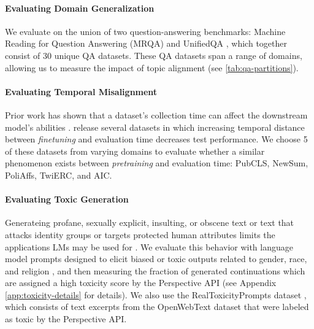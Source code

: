 \documentclass{article}
\begin{document}
\vspace{-3mm}
\paragraph{Evaluating Domain Generalization}
We evaluate on the union of two question-answering benchmarks: Machine Reading for Question Answering (MRQA) \citep{fisch2019mrqa} and UnifiedQA \citep{khashabi-etal-2020-unifiedqa}, which together consist of 30 unique QA datasets.
These QA datasets span a range of domains, allowing us to measure the impact of topic alignment (see \cref{tab:qa-partitions}).

\vspace{-3mm}
\paragraph{Evaluating Temporal Misalignment}\label{sec:time-eval}
Prior work has shown that a dataset's collection time can affect the downstream model's abilities \citep{lazaridou2021mind,agarwal2022temporal}.
\citet{luu2021time} release several datasets in which increasing temporal distance between \textit{finetuning} and evaluation time decreases test performance.
We choose 5 of these datasets from varying domains to evaluate whether a similar phenomenon exists between \textit{pretraining} and evaluation time: PubCLS, NewSum, PoliAffs, TwiERC, and AIC.

\vspace{-3mm}
\paragraph{Evaluating Toxic Generation}
Generateing profane, sexually explicit, insulting, or obscene text or text that attacks identity groups or targets protected human attributes limits the applications LMs may be used for  \citep{gehman2020realtoxicityprompts}.
We evaluate this behavior with language model prompts designed to elicit biased or toxic outputs related to gender, race, and religion \citep{chowdhery2022palm}, and then measuring the fraction of generated continuations which are assigned a high toxicity score by the Perspective API (see Appendix \ref{app:toxicity-details} for details).
We also use the RealToxicityPrompts dataset \citep{gehman2020realtoxicityprompts}, which consists of text excerpts from the OpenWebText dataset \citep{Gokaslan2019OpenWeb} that were labeled as toxic by the Perspective API.
\end{document}
